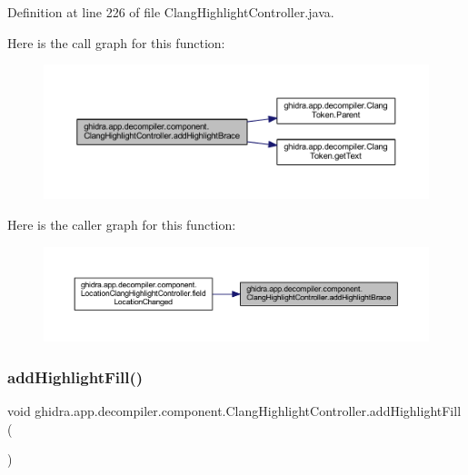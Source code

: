 Definition at line 226 of file Clang\+Highlight\+Controller.\+java.

Here is the call graph for this function\+:
\nopagebreak
\begin{figure}[H]
\begin{center}
\leavevmode
\includegraphics[width=350pt]{classghidra_1_1app_1_1decompiler_1_1component_1_1_clang_highlight_controller_a5e8c11782f11a49ec54b398220970c06_cgraph}
\end{center}
\end{figure}
Here is the caller graph for this function\+:
\nopagebreak
\begin{figure}[H]
\begin{center}
\leavevmode
\includegraphics[width=350pt]{classghidra_1_1app_1_1decompiler_1_1component_1_1_clang_highlight_controller_a5e8c11782f11a49ec54b398220970c06_icgraph}
\end{center}
\end{figure}
\mbox{\label{classghidra_1_1app_1_1decompiler_1_1component_1_1_clang_highlight_controller_a24a9a5eca47374398501c91a290d05d4}} 
\subsubsection{\texorpdfstring{addHighlightFill()}{addHighlightFill()}}
{\footnotesize\ttfamily void ghidra.\+app.\+decompiler.\+component.\+Clang\+Highlight\+Controller.\+add\+Highlight\+Fill (\begin{DoxyParamCaption}{ }\end{DoxyParamCaption})\hspace{0.3cm}{\ttfamily [inline]}}

